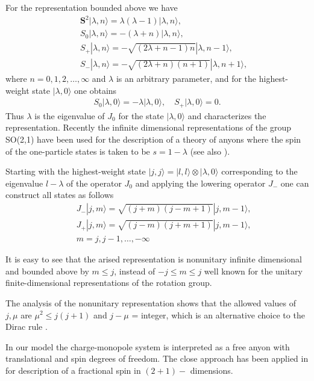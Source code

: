 \documentclass[a4paper,twocolumn,aps,showpacs,showkeys]{revtex4}
\begin{document}
For the representation bounded above we have \cite{Jan}
\begin{eqnarray*}
&&{\mathbf S}^2|\lambda, n\rangle = \lambda(\lambda - 1)|\lambda, n\rangle,\\
&&S_0|\lambda, n\rangle = -(\lambda + n)|\lambda, n\rangle,\\
&&S_{+}|\lambda, n\rangle = -\sqrt{(2\lambda + n - 1)n}|\lambda, n
-1\rangle,\\
&&S_{-}|\lambda, n\rangle = -\sqrt{(2\lambda + n)(n + 1)}|\lambda,
n + 1\rangle,
\end{eqnarray*}
where $n=0,1,2,\dots,\infty$ and $\lambda$ is an arbitrary
parameter, and for the highest-weight state $|\lambda,0\rangle$
one obtains
\begin{eqnarray*}
S_0|\lambda, 0\rangle = -\lambda |\lambda, 0\rangle,\quad
S_{+}|\lambda, 0\rangle = 0.
\end{eqnarray*}
Thus $\lambda$ is the eigenvalue of $J_0$ for the state
$|\lambda,0\rangle$ and characterizes the representation. Recently
the infinite dimensional representations of the group SO(2,1) have
been used for the description of a theory of anyons where the spin
of the one-particle states is taken to be $s= 1-\lambda$
\cite{Jan} (see also \cite{Ply1,Ply2}).

Starting with the highest-weight state $|j,j\rangle = |l,l\rangle\otimes
|\lambda,0\rangle$ corresponding to the eigenvalue $l-\lambda$ of the
operator $J_0$ and applying the lowering operator $J_{-}$  one can
construct all states as follows
\begin{eqnarray}
&&J_{-}|j, m\rangle = \sqrt{(j + m)(j - m + 1)}|j, m - 1\rangle,\\
&&J_{+}|j, m\rangle = \sqrt{(j - m)(j + m + 1)}|j, m - 1\rangle, \\
&&m= j, j-1, \dots, -\infty \nonumber
\label{rep}
\end{eqnarray}

It is easy to see that the arised representation is nonunitary
infinite dimensional and bounded above by $m \le j$, instead of
$-j \le m \le j$ well known  for the unitary finite-dimensional
representations of the rotation group.

The analysis of the nonunitary representation shows that the
allowed values of $j,\mu$ are $ \mu^2 \le j(j + 1)$ and  $j - \mu$
= integer, which is an alternative choice to the Dirac rule
\cite{Nes}.

In our model the charge-monopole system is interpreted as a free
anyon with translational and spin degrees of freedom. The close
approach has been applied in \cite{Ply3,Ply4} for description of a
fractional spin in $(2+1)-$ dimensions.
\end{document}
